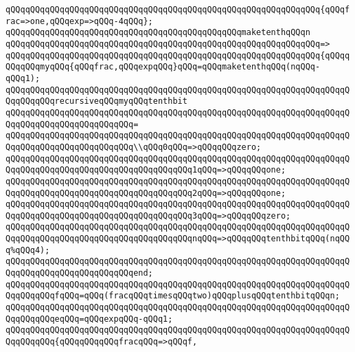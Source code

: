 \verb|qQQqqQQqqQQqqQQqqQQqqQQqqQQqqQQqqQQqqQQqqQQqqQQqqQQqqQQqqQQqqQQq{qQQqfrac=>one,qQQqexp=>qQQq-4qQQq};|\newline
\newline
\verb|qQQqqQQqqQQqqQQqqQQqqQQqqQQqqQQqqQQqqQQqqQQqqQQqmaketenthqQQqn|\newline
\verb|qQQqqQQqqQQqqQQqqQQqqQQqqQQqqQQqqQQqqQQqqQQqqQQqqQQqqQQqqQQqqQQq=>|\newline
\verb|qQQqqQQqqQQqqQQqqQQqqQQqqQQqqQQqqQQqqQQqqQQqqQQqqQQqqQQqqQQqqQQq{qQQqqQQqqQQqmyqQQq{qQQqfrac,qQQqexpqQQq}qQQq=qQQqmaketenthqQQq(nqQQq-qQQq1);|\newline
\newline
\verb|qQQqqQQqqQQqqQQqqQQqqQQqqQQqqQQqqQQqqQQqqQQqqQQqqQQqqQQqqQQqqQQqqQQqqQQqqQQqqQQqrecursiveqQQqmyqQQqtenthbit|\newline
\verb|qQQqqQQqqQQqqQQqqQQqqQQqqQQqqQQqqQQqqQQqqQQqqQQqqQQqqQQqqQQqqQQqqQQqqQQqqQQqqQQqqQQqqQQqqQQqqQQq=|\newline
\verb|qQQqqQQqqQQqqQQqqQQqqQQqqQQqqQQqqQQqqQQqqQQqqQQqqQQqqQQqqQQqqQQqqQQqqQQqqQQqqQQqqQQqqQQqqQQqqQQq\\qQQq0qQQq=>qQQqqQQqzero;|\newline
\verb|qQQqqQQqqQQqqQQqqQQqqQQqqQQqqQQqqQQqqQQqqQQqqQQqqQQqqQQqqQQqqQQqqQQqqQQqqQQqqQQqqQQqqQQqqQQqqQQqqQQqqQQqqQQq1qQQq=>qQQqqQQqone;|\newline
\verb|qQQqqQQqqQQqqQQqqQQqqQQqqQQqqQQqqQQqqQQqqQQqqQQqqQQqqQQqqQQqqQQqqQQqqQQqqQQqqQQqqQQqqQQqqQQqqQQqqQQqqQQqqQQq2qQQq=>qQQqqQQqone;|\newline
\verb|qQQqqQQqqQQqqQQqqQQqqQQqqQQqqQQqqQQqqQQqqQQqqQQqqQQqqQQqqQQqqQQqqQQqqQQqqQQqqQQqqQQqqQQqqQQqqQQqqQQqqQQqqQQq3qQQq=>qQQqqQQqzero;|\newline
\verb|qQQqqQQqqQQqqQQqqQQqqQQqqQQqqQQqqQQqqQQqqQQqqQQqqQQqqQQqqQQqqQQqqQQqqQQqqQQqqQQqqQQqqQQqqQQqqQQqqQQqqQQqqQQqnqQQq=>qQQqqQQqtenthbitqQQq(nqQQq%qQQq4);|\newline
\verb|qQQqqQQqqQQqqQQqqQQqqQQqqQQqqQQqqQQqqQQqqQQqqQQqqQQqqQQqqQQqqQQqqQQqqQQqqQQqqQQqqQQqqQQqqQQqqQQqend;|\newline
\newline
\verb|qQQqqQQqqQQqqQQqqQQqqQQqqQQqqQQqqQQqqQQqqQQqqQQqqQQqqQQqqQQqqQQqqQQqqQQqqQQqqQQqfqQQq=qQQq(fracqQQqtimesqQQqtwo)qQQqplusqQQqtenthbitqQQqn;|\newline
\verb|qQQqqQQqqQQqqQQqqQQqqQQqqQQqqQQqqQQqqQQqqQQqqQQqqQQqqQQqqQQqqQQqqQQqqQQqqQQqqQQqeqQQq=qQQqexpqQQq-qQQq1;|\newline
\newline
\verb|qQQqqQQqqQQqqQQqqQQqqQQqqQQqqQQqqQQqqQQqqQQqqQQqqQQqqQQqqQQqqQQqqQQqqQQqqQQqqQQq{qQQqqQQqqQQqfracqQQq=>qQQqf,|\newline
